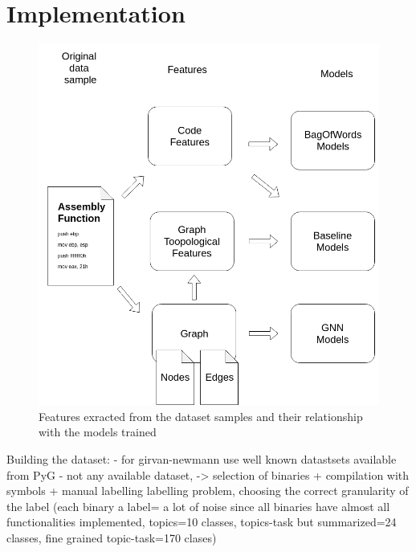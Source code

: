 \section{Implementation}



\begin{figure}[H]
    \centering
        \includegraphics[width=0.95\linewidth]{img/Features_and_models_diagram.png}
    \caption{Features exracted from the dataset samples and their relationship with the models trained}\label{fig:Features_diagram}
\end{figure}



Building the dataset:
	- for girvan-newmann use well known datastsets available from PyG
	- not any available dataset, -> selection of binaries + compilation with symbols 
	 + manual labelling
	labelling problem, choosing the correct granularity of the label (each binary a label= a lot of noise since all binaries have almost all functionalities implemented, topics=10 classes, topics-task but summarized=24 classes, fine grained topic-task=170 clases)
